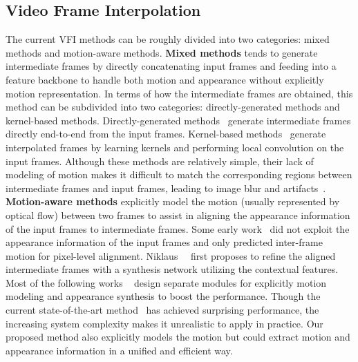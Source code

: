\documentclass[10pt,twocolumn,letterpaper]{article}
\begin{document}
	\subsection{Video Frame Interpolation}
        The current VFI methods can be roughly divided into two categories: mixed methods and motion-aware methods.
\textbf{Mixed methods} tends to generate intermediate frames by directly concatenating input frames and feeding into a feature backbone to handle both motion and appearance without explicitly motion representation. In terms of how the intermediate frames are obtained, this method can be subdivided into two categories: directly-generated methods and kernel-based methods. Directly-generated methods~\cite{gui2020featureflow,long2016learning,choi2020channel,kalluri2020flavr} generate intermediate frames directly end-to-end from the input frames. Kernel-based methods~\cite{shi2022video,lee2020adacof,cheng2020video,cheng2021multiple,niklaus2017video,niklaus2017videoas,niklaus2021revisiting,ding2021cdfi} generate interpolated frames by learning kernels and performing local convolution on the input frames. Although these methods are relatively simple, their lack of modeling of motion makes it difficult to match the corresponding regions between intermediate frames and input frames, leading to image blur and artifacts~\cite{lee2022enhanced}.
\textbf{Motion-aware methods} explicitly model the motion (usually represented by optical flow) between two frames to assist in aligning the appearance information of the input frames to intermediate frames. Some early work~\cite{liu2017video,jiang2018super,liu2019deep} did not exploit the appearance information of the input frames and only predicted inter-frame motion for pixel-level alignment. Niklaus~\etal~\cite{niklaus2018context} first proposes to refine the aligned intermediate frames with a synthesis network utilizing the contextual features. Most of the following works ~\cite{niklaus2018context,danier2022st,xue2019video,kong2022ifrnet,bao2019depth,niklaus2020softmax,park2020bmbc,huang2020rife,sim2021xvfi,park2021asymmetric,lu2022video,reda2022film} design separate modules for explicitly motion modeling and appearance synthesis to boost the performance. Though the current state-of-the-art method~\cite{lu2022video} has achieved surprising performance, the increasing system complexity makes it unrealistic to apply in practice. Our proposed method also explicitly models the motion but could extract motion and appearance information in a unified and efficient way.
\end{document}
